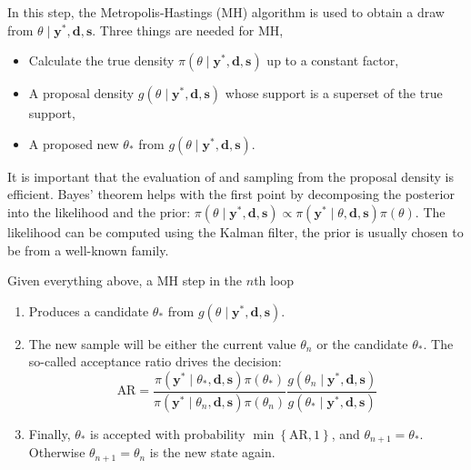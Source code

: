 In this step, the Metropolis-Hastings (MH) algorithm is used to obtain a draw from $\theta\mid\bm{y}^\ast,\bm{d},\bm s$.
Three things are needed for MH,
\begin{itemize}
	\item Calculate the true density $\pi(\theta\mid\bm{y}^\ast,\bm{d},\bm s)$ up to a constant factor,
	\item A proposal density $g(\theta\mid\bm{y}^\ast,\bm{d},\bm s)$ whose support is a superset of the true support,
	\item A proposed new $\theta_\ast$ from $g(\theta\mid\bm{y}^\ast,\bm{d},\bm s)$.
\end{itemize}
It is important that the evaluation of and sampling from the proposal density is efficient.
Bayes' theorem helps with the first point by decomposing the posterior into the likelihood and the prior: $\pi(\theta\mid\bm{y}^\ast,\bm{d},\bm s)\propto\pi(\bm{y}^\ast\mid\theta,\bm{d},\bm s)\pi(\theta)$.
The likelihood can be computed using the Kalman filter, the prior is usually chosen to be from a well-known family.

Given everything above, a MH step in the $n$th loop
\begin{enumerate}
	\item Produces a candidate $\theta_\ast$ from $g(\theta\mid\bm{y}^\ast,\bm{d},\bm s)$.
	\item The new sample will be either the current value $\theta_n$ or the candidate $\theta_\ast$. The so-called acceptance ratio drives the decision:
	\begin{equation*}
	\text{AR}=\frac{\pi(\bm{y}^\ast\mid\theta_\ast,\bm{d},\bm s)\pi(\theta_\ast)}{\pi(\bm{y}^\ast\mid\theta_n,\bm{d},\bm s)\pi(\theta_n)}\frac{g(\theta_n\mid\bm{y}^\ast,\bm{d},\bm s)}{g(\theta_\ast\mid\bm{y}^\ast,\bm{d},\bm s)}
	\end{equation*}
	\item Finally, $\theta_\ast$ is accepted with probability $\min\left\{\text{AR},1\right\}$, and $\theta_{n+1}=\theta_\ast$.
	Otherwise $\theta_{n+1}=\theta_n$ is the new state again.
\end{enumerate}

